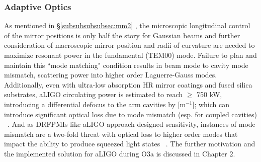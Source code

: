 


\subsubsection{Adaptive Optics}
As mentioned in \hyperref[subsubsubsubsec:mm2]{\S \ref*{subsubsubsubsec:mm2}} , the microscopic longitudinal control of the mirror positions is only half the story for Gaussian beams and further consideration of macroscopic mirror position and radii of curvature are needed to maximize resonant power in the fundamental (TEM00) mode. Failure to plan and maintain this ``mode matching" condition results in beam mode to cavity mode mismatch, scattering power into higher order Laguerre-Gauss modes. Additionally, even with ultra-low absorption HR mirror coatings and fused silica substrates, aLIGO circulating power is estimated to reach $\geq$ 750 kW, introducing a differential defocus to the arm cavities by [$\mathrm{m}^{-1}$]; which can introduce significant optical loss due to mode mismatch (esp. for coupled cavities) ~\cite{tvo}. And as DRFPMIs like aLIGO approach designed sensitivity, instances of mode mismatch are a two-fold threat with optical loss to higher order modes that impact the ability to produce squeezed light states ~\cite{oelker:2014}. The further motivation and the implemented solution for aLIGO during O3a is discussed in Chapter 2. 

